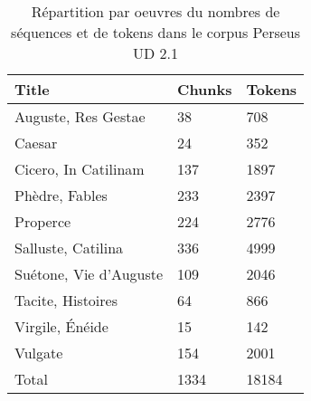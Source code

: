 \begin{table}[]
\centering
\begin{tabular}{lll}
\toprule
 Title                  & Chunks & Tokens \\ \midrule
 Auguste, Res Gestae    & 38     & 708    \\
 Caesar                 & 24     & 352    \\
 Cicero, In Catilinam   & 137    & 1897   \\
 Phèdre, Fables         & 233    & 2397   \\
 Properce               & 224    & 2776   \\
 Salluste, Catilina     & 336    & 4999   \\
 Suétone, Vie d'Auguste & 109    & 2046   \\
 Tacite, Histoires      & 64     & 866    \\
 Virgile, Énéide        & 15     & 142    \\
 Vulgate                & 154    & 2001   \\ \midrule
 Total                  & 1334   & 18184  \\ \bottomrule
\hline
\end{tabular}
\caption{Répartition par oeuvres du nombres de séquences et de tokens dans le corpus Perseus UD 2.1}
\label{table:perseus-ud:chunks-and-tokens}
\end{table}

